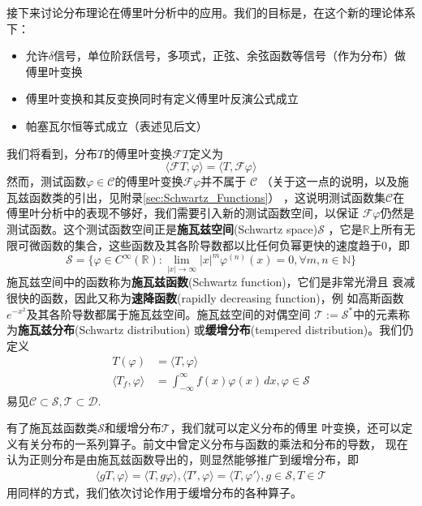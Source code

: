 \documentclass{ctexbook}
\begin{document}
接下来讨论分布理论在傅里叶分析中的应用。我们的目标是，在这个新的理论体系下：
\begin{itemize}
    \item 允许$\delta$信号，单位阶跃信号，多项式，正弦、余弦函数等信号（作为分布）做傅里叶变换
    \item 傅里叶变换和其反变换同时有定义傅里叶反演公式成立
    \item 帕塞瓦尔恒等式成立（表述见后文）
\end{itemize}
我们将看到，分布$T$的傅里叶变换$\mathcal{F} T$定义为
\begin{equation}
    \langle\mathcal{F}T,\varphi\rangle=\langle T,\mathcal{F}\varphi\rangle
\end{equation}
然而，测试函数$\varphi\in\mathcal{C} $的傅里叶变换$\mathcal{F}\varphi$并不属于
$\mathcal{C} $
（关于这一点的说明，以及施瓦兹函数类的引出，见附录\ref{sec:Schwartz_Functions}）
，这说明测试函数集$\mathcal{C} $在傅里叶分析中的表现不够好，我们需要引入新的测试函数空间，以保证
$\mathcal{F}\varphi$仍然是测试函数。这个测试函数空间正是\textbf{施瓦兹空间}(Schwartz space)$\mathcal{S} $
，它是$\mathbb{R}$上所有无限可微函数的集合，这些函数及其各阶导数都以比任何负幂更快的速度趋于0，即
\[\mathcal{S} =\{\varphi\in C^{\infty}(\mathbb{R} ):\lim_{|x|\to\infty}|x|^m\varphi^{(n)}(x)=0,\forall m,n\in\mathbb{N} \}\]
施瓦兹空间中的函数称为\textbf{施瓦兹函数}(Schwartz function)，它们是非常光滑且
衰减很快的函数，因此又称为\textbf{速降函数}(rapidly decreasing function)，例
如高斯函数$e^{-x^2}$及其各阶导数都属于施瓦兹空间。施瓦兹空间的对偶空间
$\mathcal{T} :=\mathcal{S}^*$中的元素称为\textbf{施瓦兹分布}(Schwartz distribution)
或\textbf{缓增分布}(tempered distribution)。我们仍定义
\begin{align}
    T(\varphi)                 & =\langle T,\varphi\rangle                                        \\
    \langle T_f,\varphi\rangle & =\int_{-\infty}^{\infty}f(x)\varphi(x)\,dx,\varphi\in\mathcal{S}
\end{align}
易见$\mathcal{C} \subset \mathcal{S} ,\mathcal{T} \subset\mathcal{D}. $

有了施瓦兹函数类$\mathcal{S} $和缓增分布$\mathcal{T} $，我们就可以定义分布的傅里
叶变换，还可以定义有关分布的一系列算子。前文中曾定义分布与函数的乘法和分布的导数，
现在认为正则分布是由施瓦兹函数导出的，则显然能够推广到缓增分布，即\begin{align}
    \langle gT,\varphi\rangle=\langle T,g\varphi\rangle,\langle T',\varphi\rangle=\langle T,\varphi'\rangle,g\in\mathcal{S} ,T\in\mathcal{T}
\end{align}
用同样的方式，我们依次讨论作用于缓增分布的各种算子。
\end{document}
